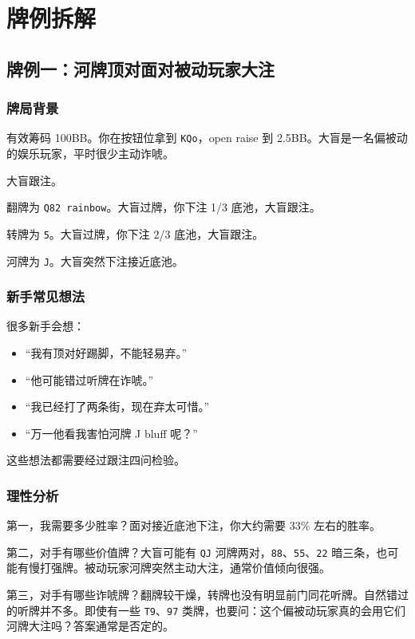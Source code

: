 \section{牌例拆解}

\subsection{牌例一：河牌顶对面对被动玩家大注}

\subsubsection*{牌局背景}

有效筹码 100BB。你在按钮位拿到 \texttt{KQo}，open raise 到 2.5BB。大盲是一名偏被动的娱乐玩家，平时很少主动诈唬。

大盲跟注。

翻牌为 \texttt{Q82 rainbow}。大盲过牌，你下注 1/3 底池，大盲跟注。

转牌为 \texttt{5}。大盲过牌，你下注 2/3 底池，大盲跟注。

河牌为 \texttt{J}。大盲突然下注接近底池。

\subsubsection*{新手常见想法}

很多新手会想：

\begin{itemize}
\item “我有顶对好踢脚，不能轻易弃。”
\item “他可能错过听牌在诈唬。”
\item “我已经打了两条街，现在弃太可惜。”
\item “万一他看我害怕河牌 J bluff 呢？”
\end{itemize}

这些想法都需要经过跟注四问检验。

\subsubsection*{理性分析}

第一，我需要多少胜率？面对接近底池下注，你大约需要 33\% 左右的胜率。

第二，对手有哪些价值牌？大盲可能有 \texttt{QJ} 河牌两对，\texttt{88}、\texttt{55}、\texttt{22} 暗三条，也可能有慢打强牌。被动玩家河牌突然主动大注，通常价值倾向很强。

第三，对手有哪些诈唬牌？翻牌较干燥，转牌也没有明显前门同花听牌。自然错过的听牌并不多。即使有一些 \texttt{T9}、\texttt{97} 类牌，也要问：这个偏被动玩家真的会用它们河牌大注吗？答案通常是否定的。


